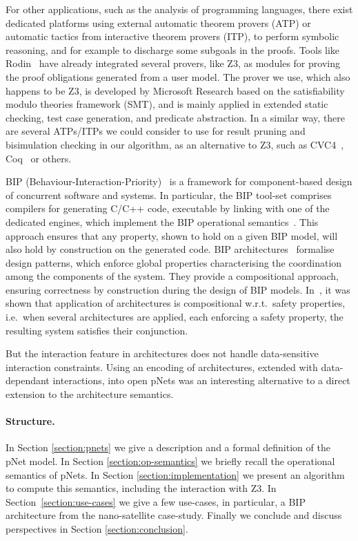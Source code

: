 \documentclass[smallcondensed]{svjour3}
\newcommand{\ie}[1][\ ]{i.e.#1}
\newcommand{\wrt}[1][\ ]{w.r.t.#1}
\begin{document}
For other applications, such as the analysis of 
programming languages, there exist dedicated platforms using
external automatic theorem 
provers (ATP) or automatic tactics from interactive theorem
provers (ITP), to perform symbolic reasoning, and for example to
discharge some subgoals in the proofs.
Tools like Rodin~\cite{deharbe2013,deharbe2014} have
already integrated several provers, like Z3, as modules for proving
the proof obligations generated from a user model. 
The prover we use, which also happens to be Z3, is developed by Microsoft Research
based on the satisfiability modulo 
theories framework (SMT), and is mainly applied in extended static checking, test case
generation, and predicate abstraction.
In a similar way, there are several ATPs/ITPs we could consider to use for
result pruning and bisimulation checking in our algorithm, as an
alternative to Z3, such as CVC4~\cite{barrett:CAV2011},
Coq~\cite{armand:CPP2011} or others. 

BIP
(Behaviour-Interaction-Priority)~\cite{bip} is a framework for 
component-based design of concurrent software and systems.  In
particular, the BIP tool-set comprises compilers for generating C/C++
code, executable by linking with one of the dedicated engines, which
implement the BIP operational semantics~\cite{BarBliu15-offer-scico}.  This
approach ensures that any property, shown to hold on a given BIP
model, will also hold by construction on the generated code.
BIP architectures~\cite{AttieBBJS16-architectures-faoc} formalise
design patterns, which enforce global properties 
characterising the coordination among the components of the
system. They provide a compositional approach, ensuring
correctness by construction during the design of BIP models.
In~\cite{AttieBBJS16-architectures-faoc}, it was shown that
application of architectures is compositional \wrt safety properties,
\ie when several architectures are applied, each enforcing a safety
property, the resulting system satisfies their conjunction.

But the interaction feature in architectures does not handle
data-sensitive interaction constraints. Using an encoding of
architectures, extended with data-dependant interactions, into open
pNets was an interesting alternative to a direct extension to the
architecture semantics.

\paragraph{Structure.}
In Section
\ref{section:pnets} we give a description and a formal definition of
the pNet model. 
In Section \ref{section:op-semantics} we briefly recall  the operational semantics
of pNets.
In Section \ref{section:implementation} we present an algorithm to compute this semantics, including the interaction with Z3.
In Section~\ref{section:use-cases} we give a few use-cases, in particular, a BIP
architecture from the nano-satellite case-study. 
Finally we conclude and discuss perspectives in Section
\ref{section:conclusion}. 
\end{document}
